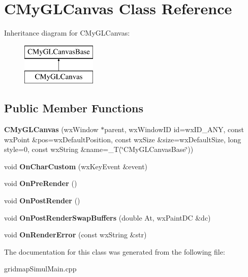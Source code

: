 \hypertarget{classCMyGLCanvas}{}\section{C\+My\+G\+L\+Canvas Class Reference}
\label{classCMyGLCanvas}
Inheritance diagram for C\+My\+G\+L\+Canvas\+:\begin{figure}[H]
\begin{center}
\leavevmode
\includegraphics[height=2.000000cm]{classCMyGLCanvas}
\end{center}
\end{figure}
\subsection*{Public Member Functions}
\begin{DoxyCompactItemize}
\item 
\mbox{\label{classCMyGLCanvas_a2444e5482d703a8d81d138cd2fb5d275}} 
{\bfseries C\+My\+G\+L\+Canvas} (wx\+Window $\ast$parent, wx\+Window\+ID id=wx\+I\+D\+\_\+\+A\+NY, const wx\+Point \&pos=wx\+Default\+Position, const wx\+Size \&size=wx\+Default\+Size, long style=0, const wx\+String \&name=\+\_\+T(\char`\"{}C\+My\+G\+L\+Canvas\+Base\char`\"{}))
\item 
\mbox{\label{classCMyGLCanvas_a136b603a8e7561bbdf15085daf349687}} 
void {\bfseries On\+Char\+Custom} (wx\+Key\+Event \&event)
\item 
\mbox{\label{classCMyGLCanvas_a99b67a508a8603e6c5cf0856e9353bf6}} 
void {\bfseries On\+Pre\+Render} ()
\item 
\mbox{\label{classCMyGLCanvas_aef8ded22cd9ecac73ad52c0ac6af46e1}} 
void {\bfseries On\+Post\+Render} ()
\item 
\mbox{\label{classCMyGLCanvas_a4be08ca79a2f75ee1a142f136307dc57}} 
void {\bfseries On\+Post\+Render\+Swap\+Buffers} (double At, wx\+Paint\+DC \&dc)
\item 
\mbox{\label{classCMyGLCanvas_a33d6dfb37f2d4f11237a3c547d683047}} 
void {\bfseries On\+Render\+Error} (const wx\+String \&str)
\end{DoxyCompactItemize}


The documentation for this class was generated from the following file\+:\begin{DoxyCompactItemize}
\item 
gridmap\+Simul\+Main.\+cpp\end{DoxyCompactItemize}
